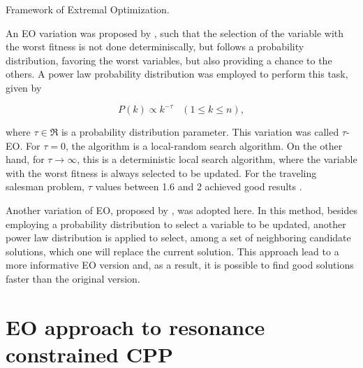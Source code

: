 \documentclass[11pt]{article}
\begin{document}
	\begin{algorithm}
		\DontPrintSemicolon
		\caption{Framework of Extremal Optimization.}
		\label{alg:eo}
	\end{algorithm}

An EO variation was proposed by \citep{Boettcher2001}, such that the selection of the variable
with the worst fitness is not done determiniscally, but follows a probability distribution,
favoring the worst variables, but also providing a chance to the others. A 
power law probability distribution was employed to perform this task, given by

\begin{equation}
P(k)\propto k^{-\tau}\;\;\;(1\leq k \leq n),
\label{eq:leipot}
\end{equation}

\noindent where $\tau \in \Re$ is a probability distribution parameter. This 
variation was called $\tau$-EO. For $\tau=0$, the algorithm is a local-random search 
algorithm. On the other hand, for $\tau\rightarrow\infty$, this is a deterministic local search
algorithm, where the variable with the worst fitness is always selected to be updated.
For the traveling salesman problem, $\tau$ values between 1.6 and 2 achieved good
results \citep{Boettcher2002}.

Another variation of EO, proposed by \citep{Chen2007}, was adopted here.
In this method, besides employing a probability distribution to select a variable
to be updated, another power law distribution is applied to select, among a set of 
neighboring candidate solutions, which one will replace the current solution.
This approach lead to a more informative EO version and, as a result, it is possible to 
find good solutions faster than the original version.

\section{EO approach to resonance constrained CPP}
\label{sec:algoritmo_proposto}
\end{document}
